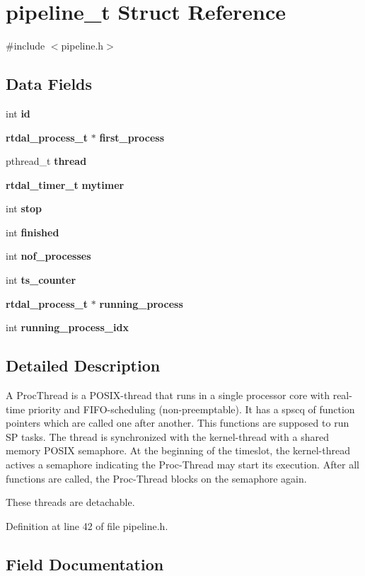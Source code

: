 \section{pipeline\-\_\-t Struct Reference}
\label{structpipeline__t}


{\ttfamily \#include $<$pipeline.\-h$>$}

\subsection*{Data Fields}
\begin{DoxyCompactItemize}
\item 
int {\bf id}
\item 
{\bf rtdal\-\_\-process\-\_\-t} $\ast$ {\bf first\-\_\-process}
\item 
pthread\-\_\-t {\bf thread}
\item 
{\bf rtdal\-\_\-timer\-\_\-t} {\bf mytimer}
\item 
int {\bf stop}
\item 
int {\bf finished}
\item 
int {\bf nof\-\_\-processes}
\item 
int {\bf ts\-\_\-counter}
\item 
{\bf rtdal\-\_\-process\-\_\-t} $\ast$ {\bf running\-\_\-process}
\item 
int {\bf running\-\_\-process\-\_\-idx}
\end{DoxyCompactItemize}


\subsection{Detailed Description}
A Proc\-Thread is a P\-O\-S\-I\-X-\/thread that runs in a single processor core with real-\/time priority and F\-I\-F\-O-\/scheduling (non-\/preemptable). It has a spscq of function pointers which are called one after another. This functions are supposed to run S\-P tasks. The thread is synchronized with the kernel-\/thread with a shared memory P\-O\-S\-I\-X semaphore. At the beginning of the timeslot, the kernel-\/thread actives a semaphore indicating the Proc-\/\-Thread may start its execution. After all functions are called, the Proc-\/\-Thread blocks on the semaphore again.

These threads are detachable. 

Definition at line 42 of file pipeline.\-h.



\subsection{Field Documentation}
